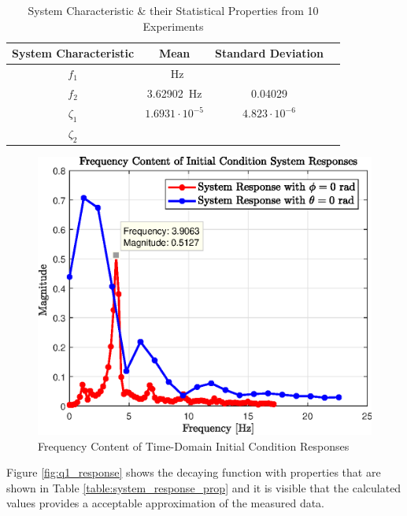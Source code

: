 \documentclass[a4paper,12pt]{article}
\begin{document}
	\begin{table}[]
		\centering
		\begin{tabular}{|c|c|c|c|}
			\hline
			 System Characteristic & Mean & Standard Deviation\\
			\hline
			\hline
			$f_{1}$ & \SI{}{Hz} &  \\
			\hline
			$f_{2}$ & \SI{3.62902}{Hz} & 0.04029 \\ 
			\hline
			$\zeta_{1}$ & $1.6931 \cdot10^{-5}$ & $4.823\cdot 10^{-6}$
			 \\
			\hline
 			$\zeta_{2}$ & & \\
 			\hline
	\end{tabular}
	\caption{System Characteristic \& their Statistical Properties from 10 Experiments}
	\label{table:system_characteristic}
	\end{table}

	
	\begin{figure}[h]
		\centering
		\includegraphics[scale=1]{FFT_system.eps}
		\caption{Frequency Content of Time-Domain Initial Condition Responses}
		\label{fig:fft_system_response}
	\end{figure}
	
	Figure \ref{fig:q1_response} shows the decaying function with properties that are shown in Table \ref{table:system_response_prop} and it is visible that the calculated values provides a acceptable approximation of the measured data.
	
\end{document}
